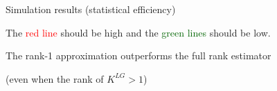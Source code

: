 \begin{frame}{Simulation results (statistical efficiency)}

\vspace{0.0755in}
The \textcolor{red}{red line} should be high and the \textcolor{darkgreen}{green lines} should be low.

\vspace{0.075in}
The rank-1 approximation outperforms the full rank estimator

\vspace{0.075in}
 {
    (even when the rank of $K^{LG}>1$)
}
\end{frame}


